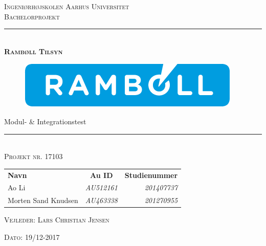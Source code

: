 \newcommand{\HRule}{\rule{\linewidth}{0.1mm}} %
\thispagestyle{empty}
\begin{center}
	\vspace{3cm}
	\textsc{\LARGE Ingeniørhøjskolen Aarhus Universitet}\\[1.5cm] %
	
	\textsc{\large Bachelorprojekt}\\[2.5 cm] 
	
	\HRule \\[0.8cm]
	{\huge \bfseries \textsc{Rambøll Tilsyn}} 
		\begin{figure}[h!]
		\centering
		\includegraphics[width=0.7\linewidth]{Forside/Logo}
	\end{figure}

	{\LARGE Modul- \& Integrationstest} \\[0.4cm]
	\HRule \\[1.5cm]
	
	\textsc{\large Projekt nr. 17103}\\
	\vspace{0.5 in}
	\begin{center}
		\begin{tabular}{l c r}
			\textbf{Navn} & \textbf{Au ID} & \textbf{Studienummer} \\
			Ao Li & \textsl{AU512161} & \textsl{201407737}    \\
			Morten Sand Knudsen & \textsl{AU463338} & \textsl{201270955}  \\
		\end{tabular}
	\end{center}
	\vspace{0.5 in}
	
	\textsc{\large Vejleder: Lars Christian Jensen}
	\vspace{0.5 in}
	
	\textsc{\large Dato: 19/12-2017}\\
	\vfill %
	
\end{center} %

\clearpage

\newpage